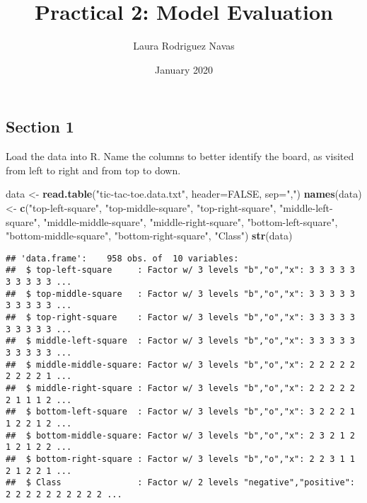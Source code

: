 \documentclass[]{article}
\title{Practical 2: Model Evaluation}
\author{Laura Rodriguez Navas}
\date{January 2020}
\newenvironment{Shaded}{\begin{snugshade}}{\end{snugshade}}
\newcommand{\DataTypeTok}[1]{\textcolor[rgb]{0.13,0.29,0.53}{#1}}
\newcommand{\KeywordTok}[1]{\textcolor[rgb]{0.13,0.29,0.53}{\textbf{#1}}}
\newcommand{\NormalTok}[1]{#1}
\newcommand{\OtherTok}[1]{\textcolor[rgb]{0.56,0.35,0.01}{#1}}
\newcommand{\StringTok}[1]{\textcolor[rgb]{0.31,0.60,0.02}{#1}}
\begin{document}
\maketitle

\hypertarget{section-1}{%
\subsection{Section 1}\label{section-1}}

Load the data into R. Name the columns to better identify the board, as
visited from left to right and from top to down.

\begin{Shaded}
\begin{Highlighting}[]
\NormalTok{data <-}\StringTok{ }\KeywordTok{read.table}\NormalTok{(}\StringTok{"tic-tac-toe.data.txt"}\NormalTok{, }\DataTypeTok{header=}\OtherTok{FALSE}\NormalTok{, }\DataTypeTok{sep=}\StringTok{","}\NormalTok{)}
\KeywordTok{names}\NormalTok{(data) <-}\StringTok{ }\KeywordTok{c}\NormalTok{(}\StringTok{"top-left-square"}\NormalTok{, }
                 \StringTok{"top-middle-square"}\NormalTok{, }
                 \StringTok{"top-right-square"}\NormalTok{, }
                 \StringTok{"middle-left-square"}\NormalTok{, }
                 \StringTok{"middle-middle-square"}\NormalTok{, }
                 \StringTok{"middle-right-square"}\NormalTok{, }
                 \StringTok{"bottom-left-square"}\NormalTok{, }
                 \StringTok{"bottom-middle-square"}\NormalTok{,}
                 \StringTok{"bottom-right-square"}\NormalTok{, }
                 \StringTok{"Class"}\NormalTok{)}
\KeywordTok{str}\NormalTok{(data)}
\end{Highlighting}
\end{Shaded}

\begin{verbatim}
## 'data.frame':    958 obs. of  10 variables:
##  $ top-left-square     : Factor w/ 3 levels "b","o","x": 3 3 3 3 3 3 3 3 3 3 ...
##  $ top-middle-square   : Factor w/ 3 levels "b","o","x": 3 3 3 3 3 3 3 3 3 3 ...
##  $ top-right-square    : Factor w/ 3 levels "b","o","x": 3 3 3 3 3 3 3 3 3 3 ...
##  $ middle-left-square  : Factor w/ 3 levels "b","o","x": 3 3 3 3 3 3 3 3 3 3 ...
##  $ middle-middle-square: Factor w/ 3 levels "b","o","x": 2 2 2 2 2 2 2 2 2 1 ...
##  $ middle-right-square : Factor w/ 3 levels "b","o","x": 2 2 2 2 2 2 1 1 1 2 ...
##  $ bottom-left-square  : Factor w/ 3 levels "b","o","x": 3 2 2 2 1 1 2 2 1 2 ...
##  $ bottom-middle-square: Factor w/ 3 levels "b","o","x": 2 3 2 1 2 1 2 1 2 2 ...
##  $ bottom-right-square : Factor w/ 3 levels "b","o","x": 2 2 3 1 1 2 1 2 2 1 ...
##  $ Class               : Factor w/ 2 levels "negative","positive": 2 2 2 2 2 2 2 2 2 2 ...
\end{verbatim}
\end{document}
